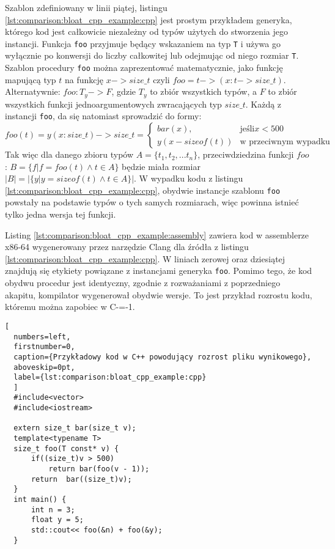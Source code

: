 Szablon zdefiniowany w linii piątej, listingu \ref{lst:comparison:bloat_cpp_example:cpp} jest prostym przykładem generyka, którego kod jest całkowicie niezależny od typów użytych do stworzenia jego instancji.
Funkcja \lstinline{foo} przyjmuje będący wskazaniem na typ \lstinline{T} i używa go wyłącznie po konwersji do liczby całkowitej lub odejmując od niego rozmiar \lstinline{T}.
Szablon procedury \lstinline{foo} można zaprezentować matematycznie, jako funkcję mapującą typ \(t\) na funkcję \(x -> size\_t\) czyli \( foo = t -> (x: t -> size\_t)\). Alternatywnie: \(foo : T_y -> F\), gdzie \(T_y\) to zbiór wszystkich typów, a \(F\) to zbiór wszystkich funkcji jednoargumentowych zwracających typ \(size\_t\).
Każdą z instancji \lstinline{foo}, da się natomiast sprowadzić do formy:\\
\(foo(t) = y(x: size\_t) -> size\_t = \begin{cases}
  bar(x), & \text{jeśli} x < 500 \\
  y(x - sizeof(t)) & \text{w przeciwnym wypadku}
\end{cases}\)\\
Tak więc dla danego zbioru typów \(A = \{t_1, t_2, ... t_n\}\), przeciwdziedzina funkcji \(foo\) : \(B = \{ f | f = foo(t) \land t \in A\}\) będzie miała rozmiar \(|B| = |\{y | y = sizeof(t) \land t \in A\}|\).
W wypadku kodu z listingu \ref{lst:comparison:bloat_cpp_example:cpp}, obydwie instancje szablonu \lstinline{foo} powstały na podstawie typów o tych samych rozmiarach, więc powinna istnieć tylko jedna wersja tej funkcji.

Listing \ref{lst:comparison:bloat_cpp_example:assembly} zawiera kod w assemblerze x86-64 wygenerowany przez narzędzie Clang dla źródła z listingu \ref{lst:comparison:bloat_cpp_example:cpp}.
W liniach zerowej oraz dziesiątej znajdują się etykiety powiązane z instancjami generyka \lstinline{foo}.
Pomimo tego, że kod obydwu procedur jest identyczny, zgodnie z rozważaniami z poprzedniego akapitu, kompilator wygenerował obydwie wersje.
To jest przykład rozrostu kodu, któremu można zapobiec w C-=-1.

\begin{lstlisting}[
  numbers=left,
  firstnumber=0,
  caption={Przykładowy kod w C++ powodujący rozrost pliku wynikowego},
  aboveskip=0pt,
  label={lst:comparison:bloat_cpp_example:cpp}
  ]
  #include<vector>
  #include<iostream>
  
  extern size_t bar(size_t v);
  template<typename T>
  size_t foo(T const* v) {
      if((size_t)v > 500)
          return bar(foo(v - 1));
      return  bar((size_t)v);
  }
  int main() {
      int n = 3;
      float y = 5;
      std::cout<< foo(&n) + foo(&y);
  }


\end{lstlisting}

